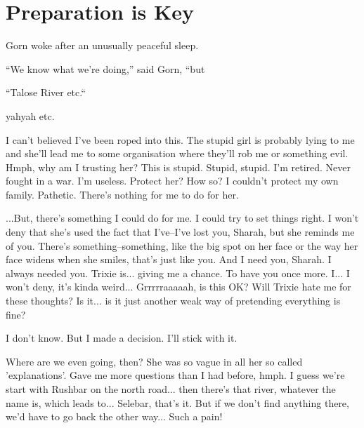 \chapter{Preparation is Key}

Gorn woke after an unusually peaceful sleep.

``We know what we're doing,'' said Gorn, ``but 

``Talose River etc.``

yahyah etc.

I can't believed I've been roped into this. The stupid girl is probably lying to
me and she'll lead me to some organisation where they'll rob me or something
evil. Hmph, why am I trusting her? This is stupid. Stupid, stupid. I'm retired.
Never fought in a war. I'm useless. Protect her? How so? I couldn't protect my
own family. Pathetic. There's nothing for me to do for her.

...But, there's something I could do for me. I could try to set things right. I
won't deny that she's used the fact that I've--I've lost you, Sharah, but she
reminds me of you. There's something--something, like the big spot on her face
or the way her face widens when she smiles, that's just like you. And I need
you, Sharah. I always needed you. Trixie is... giving me a chance. To have you
once more. I... I won't deny, it's kinda weird... Grrrrraaaaah, is this OK? Will
Trixie hate me for these thoughts? Is it... is it just another weak way of
pretending everything is fine?

I don't know. But I made a decision. I'll stick with it.

Where are we even going, then? She was so vague in all her so called
'explanations'. Gave me more questions than I had before, hmph. I guess we're
start with Rushbar on the north road... then there's that river, whatever the
name is, which leads to... Selebar, that's it. But if we don't find anything
there, we'd have to go back the other way... Such a pain!
